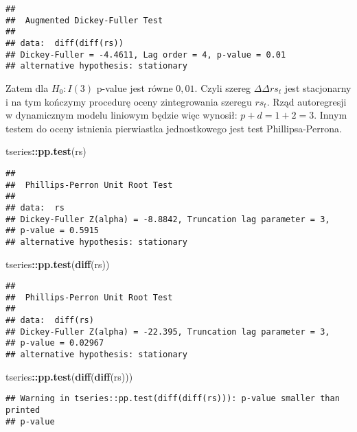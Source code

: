 \documentclass[polish,]{book}
\newenvironment{Shaded}{\begin{snugshade}}{\end{snugshade}}
\newcommand{\KeywordTok}[1]{\textcolor[rgb]{0.13,0.29,0.53}{\textbf{#1}}}
\newcommand{\NormalTok}[1]{#1}
\newcommand{\OperatorTok}[1]{\textcolor[rgb]{0.81,0.36,0.00}{\textbf{#1}}}
\begin{document}
\begin{verbatim}
## 
##  Augmented Dickey-Fuller Test
## 
## data:  diff(diff(rs))
## Dickey-Fuller = -4.4611, Lag order = 4, p-value = 0.01
## alternative hypothesis: stationary
\end{verbatim}

Zatem dla \(H_0: I(3)\) p-value jest równe \(0,01\). Czyli szereg \(\Delta\Delta rs_t\) jest stacjonarny i
na tym kończymy procedurę oceny zintegrowania szeregu \(rs_t\). Rząd autoregresji w
dynamicznym modelu liniowym będzie więc wynosił: \(p + d = 1 + 2 = 3\). Innym
testem do oceny istnienia pierwiastka jednostkowego jest test Phillipsa-Perrona.

\begin{Shaded}
\begin{Highlighting}[]
\NormalTok{tseries}\OperatorTok{::}\KeywordTok{pp.test}\NormalTok{(rs)}
\end{Highlighting}
\end{Shaded}

\begin{verbatim}
## 
##  Phillips-Perron Unit Root Test
## 
## data:  rs
## Dickey-Fuller Z(alpha) = -8.8842, Truncation lag parameter = 3,
## p-value = 0.5915
## alternative hypothesis: stationary
\end{verbatim}

\begin{Shaded}
\begin{Highlighting}[]
\NormalTok{tseries}\OperatorTok{::}\KeywordTok{pp.test}\NormalTok{(}\KeywordTok{diff}\NormalTok{(rs))}
\end{Highlighting}
\end{Shaded}

\begin{verbatim}
## 
##  Phillips-Perron Unit Root Test
## 
## data:  diff(rs)
## Dickey-Fuller Z(alpha) = -22.395, Truncation lag parameter = 3,
## p-value = 0.02967
## alternative hypothesis: stationary
\end{verbatim}

\begin{Shaded}
\begin{Highlighting}[]
\NormalTok{tseries}\OperatorTok{::}\KeywordTok{pp.test}\NormalTok{(}\KeywordTok{diff}\NormalTok{(}\KeywordTok{diff}\NormalTok{(rs)))}
\end{Highlighting}
\end{Shaded}

\begin{verbatim}
## Warning in tseries::pp.test(diff(diff(rs))): p-value smaller than printed
## p-value
\end{verbatim}
\end{document}
